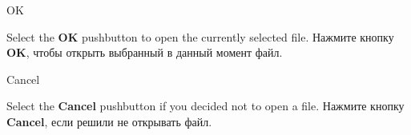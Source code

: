\begin{popup}
\caption{OK}

\ifenglish
Select the {\bf OK} pushbutton to open the currently selected file.
 \else
Нажмите кнопку {\bf OK}, чтобы открыть выбранный в данный момент файл.
\fi
\end{popup}

\begin{popup}
\caption{Cancel}

\ifenglish
Select the {\bf Cancel} pushbutton if you decided not to open a file.
 \else
Нажмите кнопку {\bf Cancel}, если решили не открывать файл.
\fi
\end{popup}
